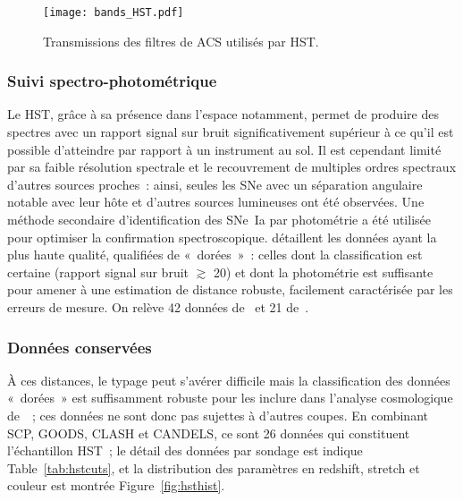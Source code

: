\documentclass[../main/main.tex]{subfiles}
\begin{document}
\begin{figure}[h!]
    \centering
    \texttt{[image: bands\_HST.pdf]}
    \captionsetup{justification=centering}
    \caption{Transmissions des filtres de ACS utilisés par HST.}
    \label{fig:hstbands}
\end{figure}

\subsubsection{Suivi spectro-photométrique}\label{sssec:hstspectro}

Le HST, grâce à sa présence dans l'espace notamment, permet de produire des
spectres avec un rapport signal sur bruit significativement supérieur à ce qu'il
est possible d'atteindre par rapport à un instrument au sol. Il est cependant
limité par sa faible résolution spectrale et le recouvrement de multiples ordres
spectraux d'autres sources proches~: ainsi, seules les SNe avec un séparation
angulaire notable avec leur hôte et d'autres sources lumineuses ont été
observées. Une méthode secondaire d'identification des SNe~Ia par photométrie a
été utilisée pour optimiser la confirmation spectroscopique. \cite{riess2007}
détaillent les données ayant la plus haute qualité, qualifiées de «~dorées~»~:
celles dont la classification est certaine (rapport signal sur bruit $\gtrsim$
20) et dont la photométrie est suffisante pour amener à une estimation de
distance robuste, facilement caractérisée par les erreurs de mesure. On relève
42 données de~\cite{strolger2004} et 21 de~\cite{riess2007}.

\subsubsection{Données conservées}\label{sssec:hstdata}

À ces distances, le typage peut s'avérer difficile mais la classification des
données «~dorées~» est suffisamment robuste pour les inclure dans l'analyse
cosmologique de~\citep{scolnic2018}~; ces données ne sont donc pas sujettes à
d'autres coupes. En combinant SCP, GOODS, CLASH et CANDELS, ce sont 26 données
qui constituent l'échantillon HST~; le détail des données par sondage est
indique Table~\ref{tab:hstcuts}, et la distribution des paramètres en redshift,
stretch et couleur est montrée Figure~\ref{fig:hsthist}.
\end{document}

